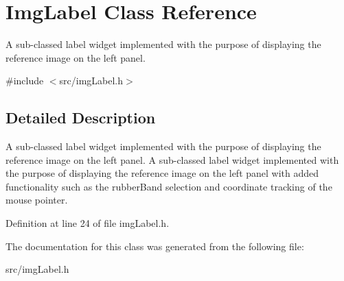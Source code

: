 \hypertarget{classImgLabel}{
\section{ImgLabel Class Reference}
\label{classImgLabel}
}


A sub-\/classed label widget implemented with the purpose of displaying the reference image on the left panel.  


{\ttfamily \#include $<$src/imgLabel.h$>$}

\subsection{Detailed Description}
A sub-\/classed label widget implemented with the purpose of displaying the reference image on the left panel. A sub-\/classed label widget implemented with the purpose of displaying the reference image on the left panel with added functionality such as the rubberBand selection and coordinate tracking of the mouse pointer. 

Definition at line 24 of file imgLabel.h.

The documentation for this class was generated from the following file:\begin{DoxyCompactItemize}
\item 
src/imgLabel.h\end{DoxyCompactItemize}
